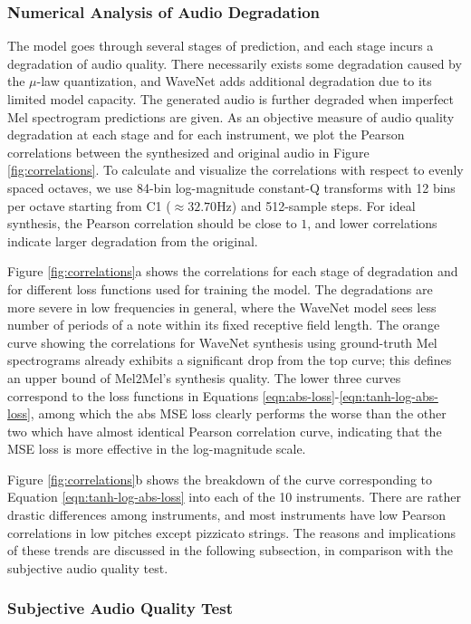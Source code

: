 \subsubsection{Numerical Analysis of Audio Degradation}

The model goes through several stages of prediction, and each stage incurs a degradation of audio quality.
There necessarily exists some degradation caused by the $\mu$-law quantization, and WaveNet adds additional degradation due to its limited model capacity.
The generated audio is further degraded when imperfect Mel spectrogram predictions are given.
As an objective measure of audio quality degradation at each stage and for each instrument, we plot the Pearson correlations between the synthesized and original audio in Figure \ref{fig:correlations}.
To calculate and visualize the correlations with respect to evenly spaced octaves, we use 84-bin log-magnitude constant-Q transforms with 12 bins per octave starting from C1 ($\approx 32.70 \textrm{Hz}$) and 512-sample steps.
For ideal synthesis, the Pearson correlation should be close to $1$, and lower correlations indicate larger degradation from the original.

Figure \ref{fig:correlations}a shows the correlations for each stage of degradation and for different loss functions used for training the model.
The degradations are more severe in low frequencies in general, where the WaveNet model sees less number of periods of a note within its fixed receptive field length.
The orange curve showing the correlations for WaveNet synthesis using ground-truth Mel spectrograms already exhibits a significant drop from the top curve; this defines an upper bound of Mel2Mel's synthesis quality.
The lower three curves correspond to the loss functions in Equations \ref{eqn:abs-loss}-\ref{eqn:tanh-log-abs-loss}, among which the abs MSE loss clearly performs the worse than the other two which have almost identical Pearson correlation curve, indicating that the MSE loss is more effective in the log-magnitude scale.

Figure \ref{fig:correlations}b shows the breakdown of the curve corresponding to Equation \ref{eqn:tanh-log-abs-loss} into each of the 10 instruments.
There are rather drastic differences among instruments, and most instruments have low Pearson correlations in low pitches except pizzicato strings.
The reasons and implications of these trends are discussed in the following subsection, in comparison with the subjective audio quality test.

\subsubsection{Subjective Audio Quality Test}\label{sec:subjective}

